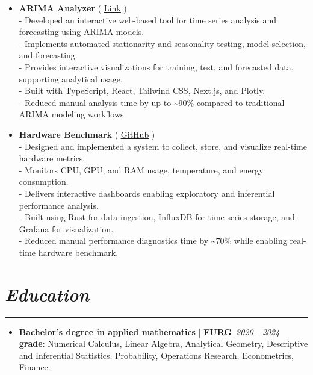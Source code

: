 \documentclass[11pt,a4paper]{article}
\newcommand{\customsection}[1]{
    \section*{{{\textbf{\textit{#1}}}}}

    \vspace{-2em}
    \rule{\textwidth}{0.4pt}

}
\begin{document}
\begin{itemize}[label=$\bullet$, leftmargin=*]
	\item \textbf{ARIMA Analyzer} ( \faGlobe \hspace{0.1cm} \href{https://arima-analyzer.vercel.app}{\underline{Link}} )\vspace{0.5em} \\
	- Developed an interactive web-based tool for time series analysis and forecasting using ARIMA models. \\
	- Implements automated stationarity and seasonality testing, model selection, and forecasting. \\
	- Provides interactive visualizations for training, test, and forecasted data, supporting analytical usage. \\
	- Built with TypeScript, React, Tailwind CSS, Next.js, and Plotly. \\
	- Reduced manual analysis time by up to \textasciitilde{}90\% compared to traditional ARIMA modeling workflows.
	\item \textbf{Hardware Benchmark} ( \faGithub \hspace{0.1cm} \href{https://github.com/aryelsoares/datalink}{\underline{GitHub}} )\vspace{0.5em} \\
	- Designed and implemented a system to collect, store, and visualize real-time hardware metrics. \\
	- Monitors CPU, GPU, and RAM usage, temperature, and energy consumption. \\
	- Delivers interactive dashboards enabling exploratory and inferential performance analysis. \\
	- Built using Rust for data ingestion, InfluxDB for time series storage, and Grafana for visualization. \\
	- Reduced manual performance diagnostics time by \textasciitilde{}70\% while enabling real-time hardware benchmark.
\end{itemize}

\customsection{Education}

\begin{itemize}[label=$\bullet$, leftmargin=*]
\item \textbf{Bachelor's degree in applied mathematics} | \textbf{FURG}\hfill \faCalendar\ \textit{2020 - 2024} \\[10pt]\textbf{grade}: Numerical Calculus, Linear Algebra, Analytical Geometry, Descriptive and Inferential Statistics. Probability, Operations Research, Econometrics, Finance.
\end{itemize}
\end{document}

